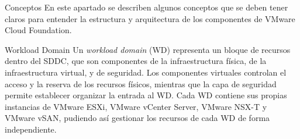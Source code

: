 \begin{section}{Conceptos}
En este apartado se describen algunos conceptos que se deben tener claros para entender la estructura y arquitectura de los componentes de VMware Cloud Foundation.



\begin{subsection}{Workload Domain}
Un \textit{workload domain} (WD) representa un bloque de recursos dentro del SDDC, que son componentes de la infraestructura física, de la infraestructura virtual, y de seguridad. Los componentes virtuales controlan el acceso y la reserva de los recursos físicos, mientras que la capa de seguridad permite establecer organizar la entrada al WD. Cada WD contiene sus propias instancias de VMware ESXi, VMware vCenter Server, VMware NSX-T y VMware vSAN, pudiendo así gestionar los recursos de cada WD de forma independiente.


\end{subsection}
\end{section}
